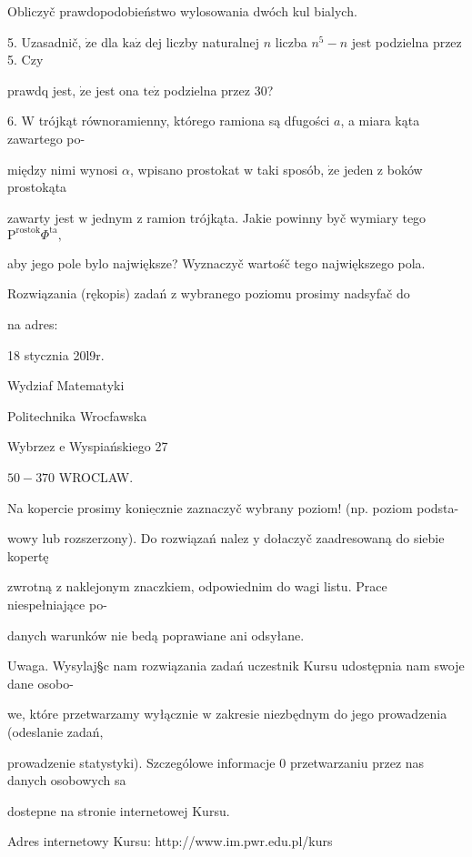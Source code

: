 \documentclass[a4paper,12pt]{article}
\begin{document}
Obliczyč prawdopodobieństwo wylosowania dwóch kul bialych.

5. Uzasadnič, $\dot{\mathrm{z}}\mathrm{e}$ dla $\mathrm{k}\mathrm{a}\dot{\mathrm{z}}$ dej liczby naturalnej $n$ liczba $n^{5}-n$ jest podzielna przez 5. Czy

prawdq jest, $\dot{\mathrm{z}}\mathrm{e}$ jest ona $\mathrm{t}\mathrm{e}\dot{\mathrm{z}}$ podzielna przez 30?

6. $\mathrm{W}$ trójkąt równoramienny, którego ramiona są dfugości $a$, a miara kąta zawartego po-

między nimi wynosi $\alpha$, wpisano prostokat $\mathrm{w}$ taki sposób, $\dot{\mathrm{z}}\mathrm{e}$ jeden $\mathrm{z}$ boków prostokąta

zawarty jest $\mathrm{w}$ jednym $\mathrm{z}$ ramion trójkąta. Jakie powinny byč wymiary tego $\mathrm{P}^{\mathrm{r}\mathrm{o}\mathrm{s}\mathrm{t}\mathrm{o}\mathrm{k}}\Phi^{\mathrm{t}\mathrm{a}},$

aby jego pole bylo największe? Wyznaczyč wartośč tego największego pola.

Rozwiązania (rękopis) zadań z wybranego poziomu prosimy nadsyfač do

na adres:

18 stycznia 20l9r.

Wydziaf Matematyki

Politechnika Wrocfawska

Wybrzez $\mathrm{e}$ Wyspiańskiego 27

$50-370$ WROCLAW.

Na kopercie prosimy $\underline{\mathrm{k}\mathrm{o}\mathrm{n}\mathrm{i}\mathrm{e}\mathrm{c}\mathrm{z}\mathrm{n}\mathrm{i}\mathrm{e}}$ zaznaczyč wybrany poziom! (np. poziom podsta-

wowy lub rozszerzony). Do rozwiązań nalez $\mathrm{y}$ dołaczyč zaadresowaną do siebie kopertę

zwrotną $\mathrm{z}$ naklejonym znaczkiem, odpowiednim do wagi listu. Prace niespełniające po-

danych warunków nie bedą poprawiane ani odsyłane.

Uwaga. Wysylaj\S c nam rozwiązania zadań uczestnik Kursu udostępnia nam swoje dane osobo-

we, które przetwarzamy wyłącznie $\mathrm{w}$ zakresie niezbędnym do jego prowadzenia (odeslanie zadań,

prowadzenie statystyki). Szczególowe informacje $0$ przetwarzaniu przez nas danych osobowych sa

dostepne na stronie internetowej Kursu.

Adres internetowy Kursu: http://www.im.pwr.edu.pl/kurs
\end{document}
